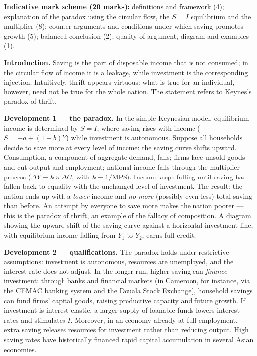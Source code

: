 \documentclass[11pt]{article}
\newcommand{\cle}[1]{{\popxbold\color{popdark}#1}}
\begin{document}
\begin{corrige}
\textbf{Indicative mark scheme (20 marks):} definitions and framework (4); explanation of the paradox using the circular flow, the $S = I$ equilibrium and the multiplier (8); counter-arguments and conditions under which saving promotes growth (5); balanced conclusion (2); quality of argument, diagram and examples (1).

\textbf{Introduction.} Saving is the part of disposable income that is not consumed; in the circular flow of income it is a leakage, while investment is the corresponding injection. Intuitively, thrift appears virtuous: what is true for an individual, however, need not be true for the whole nation. The statement refers to Keynes's \cle{paradox of thrift}.

\textbf{Development 1 — the paradox.} In the simple Keynesian model, equilibrium income is determined by $S = I$, where saving rises with income ($S = -a + (1-b)Y$) while investment is autonomous. Suppose all households decide to save more at every level of income: the saving curve shifts upward. Consumption, a component of aggregate demand, falls; firms face unsold goods and cut output and employment; national income falls through the multiplier process ($\Delta Y = k \times \Delta C$, with $k = 1/\text{MPS}$). Income keeps falling until saving has fallen back to equality with the unchanged level of investment. The result: the nation ends up with a \emph{lower} income and \emph{no more} (possibly even less) total saving than before. An attempt by everyone to save more makes the nation poorer — this is the paradox of thrift, an example of the fallacy of composition. A diagram showing the upward shift of the saving curve against a horizontal investment line, with equilibrium income falling from $Y_1$ to $Y_2$, earns full credit.

\textbf{Development 2 — qualifications.} The paradox holds under restrictive assumptions: investment is autonomous, resources are unemployed, and the interest rate does not adjust. In the longer run, higher saving can \emph{finance} investment: through banks and financial markets (in Cameroon, for instance, via the CEMAC banking system and the Douala Stock Exchange), household savings can fund firms' capital goods, raising productive capacity and future growth. If investment is interest-elastic, a larger supply of loanable funds lowers interest rates and stimulates $I$. Moreover, in an economy already at full employment, extra saving releases resources for investment rather than reducing output. High saving rates have historically financed rapid capital accumulation in several Asian economies.


\end{corrige}
\end{document}
